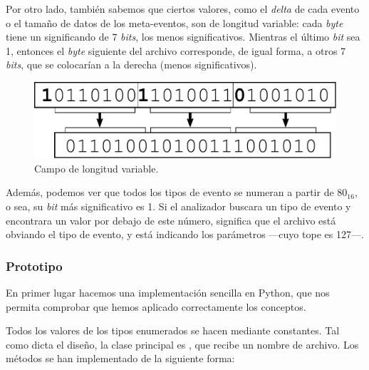 \smallskip

Por otro lado, también sabemos que ciertos valores, como el \textit{delta} de cada evento o el tamaño de datos de los meta-eventos, son de longitud variable: cada \textit{byte} tiene un significando de 7 \textit{bits}, los menos significativos. Mientras el último \textit{bit} sea 1, entonces el \textit{byte} siguiente del archivo corresponde, de igual forma, a otros 7 \textit{bits}, que se colocarían a la derecha (menos significativos).

\smallskip

\begin{figure}[H]
	\noindent \begin{centering}
		\includegraphics[width=\linewidth/2]{capitulo5/varlen}
		\par\end{centering}
	\smallskip
	\caption{\label{fig:varlen} Campo de longitud variable.}
\end{figure}

\smallskip

Además, podemos ver que todos los tipos de evento se numeran a partir de $80_{16}$, o sea, su \textit{bit} más significativo es 1. Si el analizador buscara un tipo de evento y encontrara un valor por debajo de este número, significa que el archivo está obviando el tipo de evento, y está indicando los parámetros ---cuyo tope es 127---.

\subsubsection{Prototipo}

En primer lugar hacemos una implementación sencilla en Python, que nos permita comprobar que hemos aplicado correctamente los conceptos.

Todos los valores de los tipos enumerados se hacen mediante constantes. Tal como dicta el diseño, la clase principal es , que recibe un nombre de archivo. Los métodos se han implementado de la siguiente forma:

